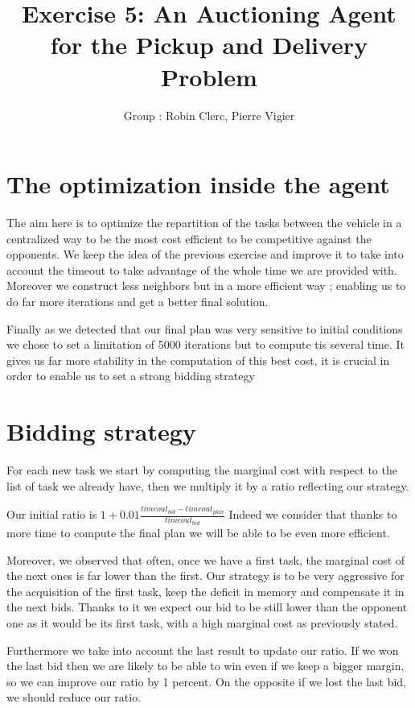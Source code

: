 \documentclass[11pt]{article}
\title{\bf Exercise 5: An Auctioning Agent for the Pickup and Delivery Problem}
\author{Group \textnumero 3: Robin Clerc, Pierre Vigier}
\begin{document}
\maketitle

\section{The optimization inside the agent}

The aim here is to optimize the repartition of the tasks between the vehicle in a centralized way to be the most cost efficient to be competitive against the opponents. We keep the idea of the previous exercise and improve it to take into account the timeout to take advantage of the whole time we are provided with.
Moreover we construct less neighbors but in a more efficient way ; enabling us to do far more iterations and get a better final solution.

Finally as we detected that our final plan was very sensitive to initial conditions we chose to set a limitation of 5000 iterations but to compute tis several time. It gives us far more stability in the computation of this best cost, it is crucial in order to enable us to set a strong bidding strategy

\section{Bidding strategy}

For each new task we start by computing the marginal cost with respect to the list of task we already have, then we multiply it by a ratio reflecting our strategy.

Our initial ratio is $1+0.01 \frac{timeout_{bid}-timeout_{plan}}{timeout_{bid}}$ Indeed we consider that thanks to more time to compute the final plan we will be able to be even more efficient.

Moreover, we observed that often, once we have a first task, the marginal cost of the next ones is far lower than the first. Our strategy is to be very aggressive for the acquisition of the first task, keep the deficit in memory and compensate it in the next bids. Thanks to it we expect our bid to be still lower than the opponent one as it would be its first task, with a high marginal cost as previously stated.

Furthermore we take into account the last result to update our ratio. If we won the last bid then we are likely to be able to win even if we keep a bigger margin, so we can improve our ratio by 1 percent. On the opposite if we lost the last bid, we should reduce our ratio.
\end{document}
